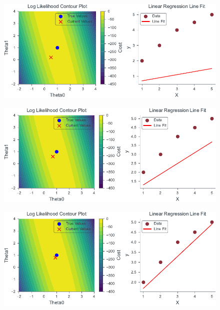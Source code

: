 \documentclass{beamer}
\begin{document}
\begin{frame}
    \begin{figure}
                \centerline{\includegraphics[scale=0.8]{../figures/mle/lin_reg_slider_1.pdf}}
\end{figure}
\end{frame}
\begin{frame}
    \begin{figure}
                \centerline{\includegraphics[scale=0.8]{../figures/mle/lin_reg_slider_2.pdf}}
\end{figure}
\end{frame}
\begin{frame}
    \begin{figure}
                \centerline{\includegraphics[scale=0.8]{../figures/mle/lin_reg_slider_3.pdf}}
\end{figure}
\end{frame}
\end{document}
